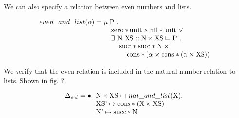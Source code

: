 \documentclass[sigplan]{acmart}
\theoremstyle{definition}
\begin{document}
We can also specify a relation between even numbers and lists.  

\[
even\_and\_list(\alpha) =  
\begin{array}[t]{@{} l}
  \mu\ \text{P}\ .\ 
  \\
  \hspace{4mm}\text{zero}*\text{unit} \times \text{nil}*\text{unit}\ \vee\ 
  \\
  \hspace{4mm}\exists\ \text{N}\ \text{XS} :: \text{N} \times \text{XS} \sqsubseteq \text{P}\ .\ 
  \\
  \hspace{8mm}\text{succ}*\text{succ}*\text{N}\ \times 
  \\
  \hspace{12mm}\text{cons}*(\alpha \times \text{cons}*(\alpha \times \text{XS}))
\end{array}
\]

We verify that the even relation is included in the natural number relation to lists.  
Shown in fig. ?.

\[
\Delta_{enl} = \bullet,\ 
\begin{array}[t]{@{} l}
  \text{N} \times \text{XS} \mapsto nat\_and\_list(\text{X}),\ 
  \\
  \text{XS'} \mapsto \text{cons}*(\text{X} \times \text{XS}),\ 
  \\
  \text{N'} \mapsto \text{succ}*\text{N}
\end{array}
\]
\end{document}
